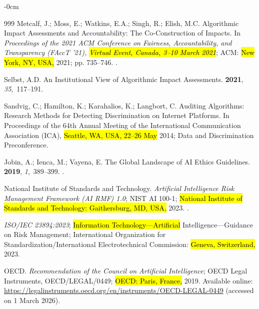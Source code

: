 \documentclass[mca,article,accept,pdftex,oneauthor]{Definitions/mdpi}
\begin{document}
\begin{adjustwidth}{-\extralength}{0cm}
\begin{thebibliography}{999}
Metcalf, J.; Moss, E.; Watkins, E.A.; Singh, R.; Elish, M.C.
\newblock Algorithmic Impact Assessments and Accountability: The
  Co-Construction of Impacts.
\newblock In \emph{Proceedings of the 2021 ACM Conference on Fairness,
  Accountability, and Transparency (FAccT '21), \hl{Virtual Event, Canada, 3--10 March 2021}}; ACM: \hl{New York, NY, USA,} 2021; pp. 735--746.
.

Selbst, A.D.
\newblock An Institutional View of Algorithmic Impact Assessments.
 {\bf 2021}, {\em
  35},~117--191.

Sandvig, C.; Hamilton, K.; Karahalios, K.; Langbort, C.
\newblock Auditing Algorithms: Research Methods for Detecting Discrimination on
  Internet Platforms.
\newblock In Proceedings of the 64th Annual Meeting of the International
  Communication Association (ICA), \hl{Seattle, WA, USA, 22--26 May} 2014;
\newblock Data and Discrimination Preconference.

Jobin, A.; Ienca, M.; Vayena, E.
\newblock The Global Landscape of {AI} Ethics Guidelines.
 {\bf 2019}, {\em 1},~389--399.
.

{National Institute of Standards and Technology}.
\newblock \emph{Artificial Intelligence Risk Management Framework ({AI RMF}) 1.0};
\newblock NIST AI 100-1; \hl{National Institute of Standards and Technology: Gaithersburg, MD, USA,} 2023.
.

\emph{ISO/IEC 23894:2023};
\newblock \hl{Information Technology---Artificial} %
 Intelligence---Guidance on Risk Management;
\newblock International Organization for Standardization/International
  Electrotechnical Commission: \hl{Geneva, Switzerland,} 2023.

{OECD}.
\newblock \emph{Recommendation of the Council on Artificial Intelligence};
\newblock OECD Legal Instruments, OECD/LEGAL/0449; \hl{OECD: Paris, France,} 2019.
\newblock Available online: {\url{https://legalinstruments.oecd.org/en/instruments/OECD-LEGAL-0449}}
(accessed on 1 March 2026).


\end{thebibliography}
\end{adjustwidth}
\end{document}
